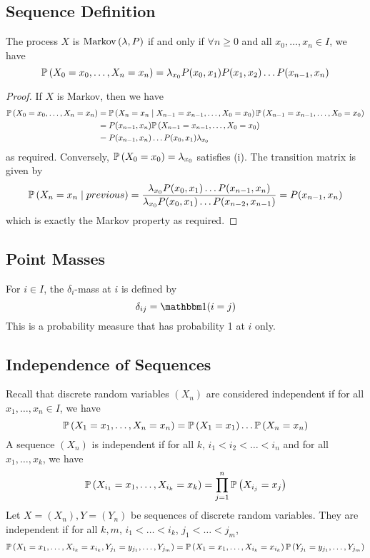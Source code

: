 \subsection{Sequence Definition}
\begin{theorem}
	The process \( X \) is \( \operatorname{Markov}\left({\lambda, P}\right) \) if and only if \( \forall n \geq 0 \) and all \( x_0, \dots, x_n \in I \), we have
	\[
		\mathbb{P}\left({X_0 = x_0, \dots, X_n = x_n}\right) = \lambda_{x_0} P(x_0, x_1) P(x_1, x_2) \dots P(x_{n-1}, x_n)
	\]
\end{theorem}
\begin{proof}
	If \( X \) is Markov, then we have
	\begin{align*}
		\mathbb{P}\left({X_0 = x_0, \dots, X_n = x_n}\right) & = \mathbb{P}\left({X_n = x_n \mid X_{n-1} = x_{n-1}, \dots, X_0 = x_0}\right) \mathbb{P}\left({X_{n-1} = x_{n-1}, \dots, X_0 = x_0}\right) \\
		                                   & = P(x_{n-1}, x_n) \mathbb{P}\left({X_{n-1} = x_{n-1}, \dots, X_0 = x_0}\right)                                           \\
		                                   & = P(x_{n-1}, x_n) \dots P(x_0, x_1) \lambda_{x_0}
	\end{align*}
	as required.
	Conversely, \( \mathbb{P}\left({X_0 = x_0}\right) = \lambda_{x_0} \) satisfies (i).
	The transition matrix is given by
	\[
		\mathbb{P}\left({X_n = x_n \mid previous}\right) = \frac{\lambda_{x_0} P(x_0, x_1) \dots P(x_{n-1}, x_n)}{\lambda_{x_0} P(x_0, x_1) \dots P(x_{n-2}, x_{n-1})} = P(x_{n-1}, x_n)
	\]
	which is exactly the Markov property as required.
\end{proof}

\subsection{Point Masses}
\begin{definition}
	For \( i \in I \), the \( \delta_i \)-mass at \( i \) is defined by
	\[
		\delta_{ij} = \mathbbm 1 (i = j)
	\]
	This is a probability measure that has probability 1 at \( i \) only.
\end{definition}

\subsection{Independence of Sequences}
Recall that discrete random variables \( (X_n) \) are considered independent if for all \( x_1, \dots, x_n \in I \), we have
\[
	\mathbb{P}\left({X_1 = x_1, \dots, X_n = x_n}\right) = \mathbb{P}\left({X_1 = x_1}\right)\dots\mathbb{P}\left({X_n = x_n}\right)
\]
A sequence \( (X_n) \) is independent if for all \( k \), \( i_1 < i_2 < \dots < i_n \) and for all \( x_1, \dots, x_k \), we have
\[
	\mathbb{P}\left({X_{i_1} = x_1, \dots, X_{i_k} = x_k}\right) = \prod_{j=1}^n \mathbb{P}\left({X_{i_j} = x_j}\right)
\]
Let \( X = (X_n), Y = (Y_n) \) be sequences of discrete random variables.
They are independent if for all \(k,m\), \( i_1 < \dots < i_k \), \( j_1 < \dots < j_m \),
\[
	\mathbb{P}\left({X_1 = x_1, \dots, X_{i_k} = x_{i_k}, Y_{j_1} = y_{j_1}, \dots, Y_{j_m}}\right) = \mathbb{P}\left({X_1 = x_1, \dots, X_{i_k} = x_{i_k}}\right) \mathbb{P}\left({Y_{j_1} = y_{j_1}, \dots, Y_{j_m}}\right)
\]

